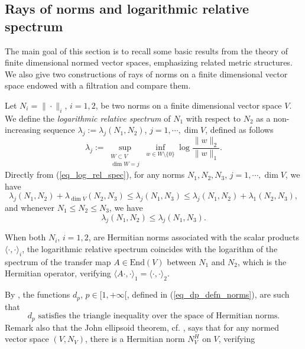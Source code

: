 \documentclass[12pt]{article}
\numberwithin{equation}{section}
\theoremstyle{theorem}
\theoremstyle{definition}
\theoremstyle{remark}
\newcommand{\enmr}[1]{\text{End}{(#1)}}
\begin{document}
	\subsection{Rays of norms and logarithmic relative spectrum}\label{sect_append}
	The main goal of this section is to recall some basic results from the theory of finite dimensional normed vector spaces, emphasizing related metric structures.
	We also give two constructions of rays of norms on a finite dimensional vector space endowed with a filtration and compare them.
	\par 
	Let $N_i = \| \cdot \|_i$, $i = 1, 2$, be two norms on a finite dimensional vector space $V$.
	We define the \textit{logarithmic relative spectrum} of $N_1$ with respect to $N_2$ as a non-increasing sequence $\lambda_j := \lambda_j(N_1, N_2)$, $j = 1, \cdots, \dim V$, defined as follows
	\begin{equation}\label{eq_log_rel_spec}
		\lambda_j
		:=
		\sup_{\substack{W \subset V \\ \dim W = j}} 
		\inf_{w \in W \setminus \{0\}} \log \frac{\| w \|_2}{\| w \|_1}.
	\end{equation}
	Directly from (\ref{eq_log_rel_spec}), for any norms $N_1, N_2, N_3$, $j = 1, \cdots, \dim V$, we have
	\begin{equation}\label{eq_log_rel_spec02}
		\lambda_j(N_1, N_2) + \lambda_{\dim V}(N_2, N_3) \leq \lambda_j(N_1, N_3) \leq \lambda_j(N_1, N_2) + \lambda_1(N_2, N_3),
	\end{equation}
	and whenever $N_1 \leq N_2 \leq N_3$, we have
	\begin{equation}\label{eq_log_rel_spec2}
		\lambda_j(N_1, N_2) \leq \lambda_j(N_1, N_3).
	\end{equation}
	\par 
	When both $N_i$, $i = 1, 2$, are Hermitian norms associated with the scalar products $\langle \cdot, \cdot \rangle_i$, the logarithmic relative spectrum coincides with the logarithm of the spectrum of the transfer map $A \in \enmr{V}$ between $N_1$ and $N_2$, which is the Hermitian operator, verifying $\langle A \cdot, \cdot \rangle_1 = \langle \cdot, \cdot \rangle_2$.
	\par 
	By \cite[Theorem 3.1]{BouckErik21}, the functions $d_p$, $p \in [1, +\infty[$, defined in (\ref{eq_dp_defn_norms}), are such that
	\begin{equation}\label{eq_triangle}
		\text{$d_p$ satisfies the triangle inequality over the space of Hermitian norms.}
	\end{equation}
	Remark also that the John ellipsoid theorem, cf. \cite[p. 27]{PisierBook}, says that for any normed vector space $(V, N_V)$, there is a Hermitian norm $N_V^H$ on $V$, verifying 
\end{document}
